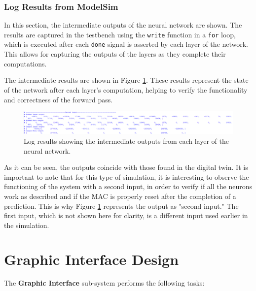 \documentclass[11pt]{report}
\begin{document}
\subsection{Log Results from ModelSim}

In this section, the intermediate outputs of the neural network are shown. The results are captured in the testbench using the \texttt{write} function in a \texttt{for} loop, which is executed after each \texttt{done} signal is asserted by each layer of the network. This allows for capturing the outputs of the layers as they complete their computations.

The intermediate results are shown in Figure \ref{fig:modelsim_logs}. These results represent the state of the network after each layer's computation, helping to verify the functionality and correctness of the forward pass.

\begin{figure}[h]
    \centering
    \includegraphics[width=1\textwidth]{images/neural_network/modelsim_NN_logs.png}
    \caption{Log results showing the intermediate outputs from each layer of the neural network.}
    \label{fig:modelsim_logs}
\end{figure}

As it can be seen, the outputs coincide with those found in the digital twin. It is important to note that for this type of simulation, it is interesting to observe the functioning of the system with a second input, in order to verify if all the neurons work as described and if the MAC is properly reset after the completion of a prediction. This is why Figure \ref{fig:modelsim_logs} represents the output as "second input." The first input, which is not shown here for clarity, is a different input used earlier in the simulation.

\chapter{Graphic Interface Design}\label{chap:graphic_interface_design}
The \textbf{Graphic Interface} sub-system performs the following tasks:
\end{document}
